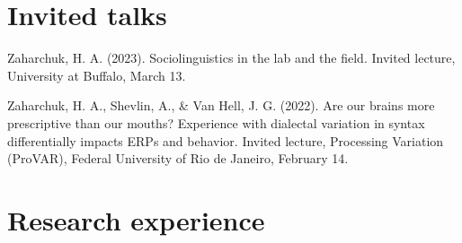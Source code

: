 \documentclass[11pt,a4paper,]{awesome-cv}
\begin{document}
\hypertarget{invited-talks}{%
\section{Invited talks}\label{invited-talks}}

\hypertarget{bibliography}{}
\leavevmode{}%
Zaharchuk, H. A. (2023). Sociolinguistics in the lab and the field.
Invited lecture, University at Buffalo, March 13.

\leavevmode{}%
Zaharchuk, H. A., Shevlin, A., \& Van Hell, J. G. (2022). Are our brains
more prescriptive than our mouths? Experience with dialectal variation
in syntax differentially impacts ERPs and behavior. Invited lecture,
Processing Variation (ProVAR), Federal University of Rio de Janeiro,
February 14.

\pagebreak

\hypertarget{research-experience}{%
\section{Research experience}\label{research-experience}}
\end{document}
